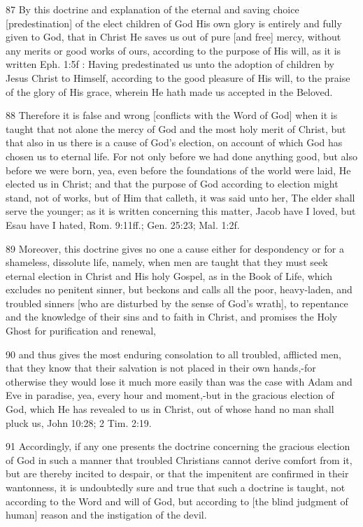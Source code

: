 {87 By this doctrine and explanation of the eternal and saving choice [predestination] of the elect children of God His own glory is entirely and fully given to God, that in Christ He saves us out of pure [and free] mercy, without any merits or good works of ours, according to the purpose of His will, as it is written Eph. 1:5f : Having predestinated us unto the adoption of children by Jesus Christ to Himself, according to the good pleasure of His will, to the praise of the glory of His grace, wherein He hath made us accepted in the Beloved.

88 Therefore it is false and wrong [conflicts with the Word of God] when it is taught that not alone the mercy of God and the most holy merit of Christ, but that also in us there is a cause of God’s election, on account of which God has chosen us to eternal life. For not only before we had done anything good, but also before we were born, yea, even before the foundations of the world were laid, He elected us in Christ; and that the purpose of God according to election might stand, not of works, but of Him that calleth, it was said unto her, The elder shall serve the younger; as it is written concerning this matter, Jacob have I loved, but Esau have I hated, Rom. 9:11ff.; Gen. 25:23; Mal. 1:2f.

89 Moreover, this doctrine gives no one a cause either for despondency or for a shameless, dissolute life, namely, when men are taught that they must seek eternal election in Christ and His holy Gospel, as in the Book of Life, which excludes no penitent sinner, but beckons and calls all the poor, heavy-laden, and troubled sinners [who are disturbed by the sense of God’s wrath], to repentance and the knowledge of their sins and to faith in Christ, and promises the Holy Ghost for purification and renewal,

90 and thus gives the most enduring consolation to all troubled, afflicted men, that they know that their salvation is not placed in their own hands,-for otherwise they would lose it much more easily than was the case with Adam and Eve in paradise, yea, every hour and moment,-but in the gracious election of God, which He has revealed to us in Christ, out of whose hand no man shall pluck us, John 10:28; 2 Tim. 2:19.

91 Accordingly, if any one presents the doctrine concerning the gracious election of God in such a manner that troubled Christians cannot derive comfort from it, but are thereby incited to despair, or that the impenitent are confirmed in their wantonness, it is undoubtedly sure and true that such a doctrine is taught, not according to the Word and will of God, but according to [the blind judgment of human] reason and the instigation of the devil.

}
